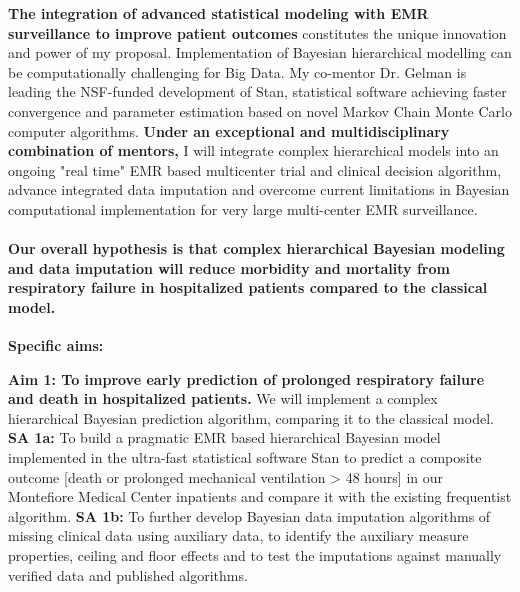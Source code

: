 \documentclass[11pt,notitlepage]{article}
\begin{document}
\newline \textbf{The integration of advanced statistical modeling with EMR surveillance to improve patient outcomes} 
constitutes the unique innovation and power of my proposal. Implementation of Bayesian hierarchical modelling can be computationally challenging for Big Data. My co-mentor Dr. Gelman is leading the NSF-funded development of Stan, statistical software achieving faster convergence and parameter estimation based on novel Markov Chain Monte Carlo computer algorithms. 
\newline \textbf {Under an exceptional and multidisciplinary combination of mentors,} I will integrate complex hierarchical models into an ongoing "real time" EMR based multicenter trial and clinical decision algorithm, advance integrated data imputation and overcome current limitations in Bayesian computational implementation for very large multi-center EMR surveillance. 
\paragraph*{Our overall hypothesis is that complex hierarchical Bayesian modeling and data imputation will reduce morbidity and mortality from respiratory failure in hospitalized patients compared to the classical model.} 

\begin{flushleft}
\textbf{Specific aims:}
\end{flushleft}

\textbf{Aim 1: To improve early prediction of prolonged respiratory failure and death in hospitalized patients.} \newline We will implement a complex hierarchical Bayesian prediction algorithm, comparing it to the classical model. \newline \textbf{SA 1a:} To build a pragmatic EMR based hierarchical Bayesian model implemented in the ultra-fast statistical software Stan to predict a composite outcome [death or prolonged mechanical ventilation > 48 hours] in our Montefiore Medical Center inpatients and compare it with the existing frequentist algorithm. \newline \textbf{SA 1b:} To further develop Bayesian data imputation algorithms of missing clinical data using auxiliary data, to identify the auxiliary measure properties, ceiling and floor effects and to test the imputations against manually verified data and published algorithms.
\end{document}
